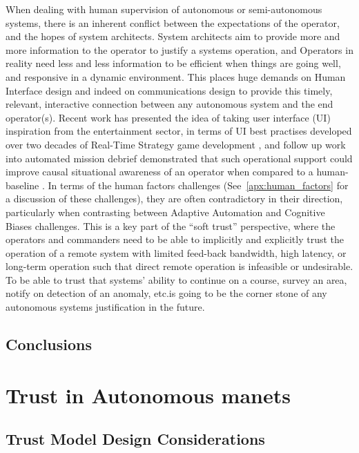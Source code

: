 When dealing with human supervision of autonomous or semi-autonomous systems, there is an inherent conflict between the expectations of the operator, and the hopes of system architects.
System architects aim to provide more and more information to the operator to justify a systems operation, and Operators in reality need less and less information to be efficient when things are going well, and responsive in a dynamic environment.
This places huge demands on Human Interface design and indeed on communications design to provide this timely, relevant, interactive connection between any autonomous system and the end operator(s).
Recent work has presented the idea of taking user interface (UI) inspiration from the entertainment sector, in terms of UI best practises developed over two decades of Real-Time Strategy game development \cite{Johnson2007}, and follow up work into automated mission debrief demonstrated that such operational support could improve causal situational awareness of an operator when compared to a human-baseline \cite{Johnson2011}.
In terms of the human factors challenges (See~\autoref{apx:human_factors} for a discussion of these challenges), they are often contradictory in their direction, particularly when contrasting between Adaptive Automation and Cognitive Biases challenges.
This is a key part of the ``soft trust'' perspective, where the operators and commanders need to be able to implicitly and explicitly trust the operation of a remote system with limited feed-back bandwidth, high latency, or long-term operation such that direct remote operation is infeasible or undesirable.
To be able to trust that systems’ ability to continue on a course, survey an area, notify on detection of an anomaly, etc.is going to be the corner stone of any autonomous systems justification in the future.

\subsection{Conclusions}




\section{Trust in Autonomous \glspl{manet}}\label{sec:trust_manets}

\subsection{Trust Model Design Considerations}\label{sec:trust_model_design_considerations}

